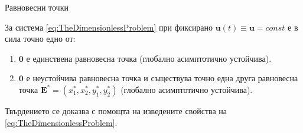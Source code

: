 \begin{frame}[t]{Равновесни точки}
  \begin{proposition}
    За система \eqref{eq:TheDimensionlessProblem} при фиксирано $\boldsymbol{u}(t) \equiv \boldsymbol{u} = const$ е в сила точно едно от:
    \begin{enumerate}
      \item $\pmb{0}$ е единствена равновесна точка (глобално асимптотично устойчива).
      \item $\pmb{0}$ е неустойчива равновесна точка и съществува точно една друга равновесна точка $\boldsymbol{E}^* = (x_1^*, x_2^*, y_1^*, y_2^*)$ (глобално асимптотично устойчива).
    \end{enumerate}
  \end{proposition}
  Твърдението се доказва с помощта на изведените свойства на \eqref{eq:TheDimensionlessProblem}.
\end{frame}
